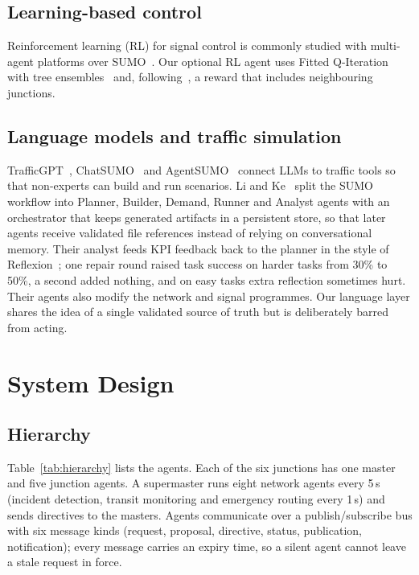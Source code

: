 \documentclass[conference]{IEEEtran}
\begin{document}
\subsection{Learning-based control}
Reinforcement learning (RL) for signal control is commonly studied with multi-agent
platforms over SUMO~\cite{bokade2024pytsc}. Our optional RL agent uses Fitted Q-Iteration
with tree ensembles~\cite{ernst2005fqi} and, following~\cite{azevedo2016jade}, a reward that
includes neighbouring junctions.

\subsection{Language models and traffic simulation}
TrafficGPT~\cite{zhang2024trafficgpt}, ChatSUMO~\cite{li2024chatsumo} and
AgentSUMO~\cite{jeong2025agentsumo} connect LLMs to traffic tools so that non-experts can
build and run scenarios. Li and Ke~\cite{li2026decoupled} split the SUMO workflow into
Planner, Builder, Demand, Runner and Analyst agents with an orchestrator that keeps
generated artifacts in a persistent store, so that later agents receive validated file
references instead of relying on conversational memory. Their analyst feeds KPI feedback
back to the planner in the style of Reflexion~\cite{shinn2023reflexion}; one repair round
raised task success on harder tasks from 30\% to 50\%, a second added nothing, and on
easy tasks extra reflection sometimes hurt. Their agents also modify the network and
signal programmes. Our language layer shares the idea of a single validated source of
truth but is deliberately barred from acting.

\section{System Design}\label{sec:design}

\subsection{Hierarchy}
Table~\ref{tab:hierarchy} lists the agents. Each of the six junctions has one master and
five junction agents. A supermaster runs eight network agents every 5\,s (incident
detection, transit monitoring and emergency routing every 1\,s) and sends directives to the
masters. Agents communicate over a publish/subscribe bus with six message kinds (request,
proposal, directive, status, publication, notification); every message carries an expiry
time, so a silent agent cannot leave a stale request in force.
\end{document}
